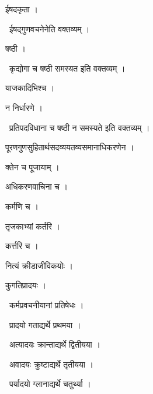 \documentclass[10pt, openany, oneside]{book}
\begin{document}
\noindent ईषदकृता ।

\par\noindent\hspace{1.5em}{\vps वा॰}~{\qt ईषद्गुणवचनेनेति वक्तव्यम् ।}

\noindent षष्ठी ।

\par\noindent\hspace{1.5em}{\vps वा॰}~{\qt कृद्योगा च षष्ठी समस्यत इति वक्तव्यम् ।}

\noindent याजकादिभिश्च ।

\noindent न निर्धारणे ।

\par\noindent\hspace{1.5em}{\vps वा॰}~{\qt प्रतिपदविधाना च षष्ठी न समस्यते इति वक्तव्यम् ।}

\noindent पूरणगुणसुहितार्थसदव्ययतव्यसमानाधिकरणेन ।

\noindent क्तेन च पूजायाम् ।

\noindent अधिकरणवाचिना च ।

\noindent कर्मणि च ।

\noindent तृजकाभ्यां कर्तरि ।

\noindent कर्त्तरि च ।

\noindent नित्यं क्रीडाजीविकयोः ।

\noindent कुगतिप्रादयः ।

\par\noindent\hspace{1.5em}{\vps वा॰}~{\qt कर्मप्रवचनीयानां प्रतिषेधः ।}

\par\noindent\hspace{1.5em}{\vps वा॰}~{\qt प्रादयो गताद्यर्थे प्रथमया ।}

\par\noindent\hspace{1.5em}{\vps वा॰}~{\qt अत्यादयः क्रान्ताद्यर्थे द्वितीयया ।}

\par\noindent\hspace{1.5em}{\vps वा॰}~{\qt अवादयः क्रुष्टाद्यर्थे तृतीयया ।}

\par\noindent\hspace{1.5em}{\vps वा॰}~{\qt पर्यादयो ग्लानाद्यर्थे चतुर्थ्या ।}
\end{document}
